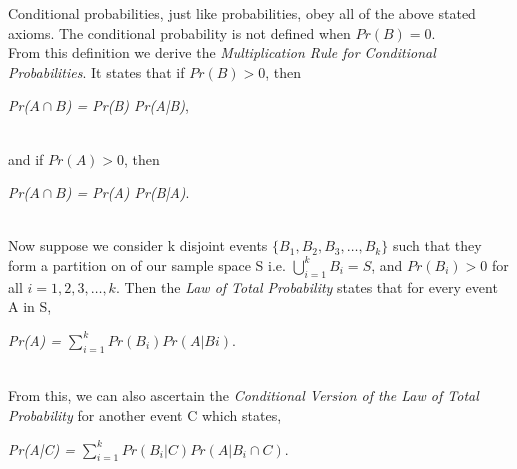 \documentclass[12pt,twoside]{reedthesis}
\begin{document}
Conditional probabilities, just like probabilities, obey all of the above stated axioms. The conditional probability is not defined when $Pr(B) = 0$. \\

From this definition we derive the \textit{Multiplication Rule for Conditional Probabilities}. It states that if $Pr(B)> 0$, then 
\begin{center} 
\textit{Pr($A\cap B$) = Pr(B) Pr(A|B)},
\end{center} \\

and if $Pr(A)> 0$, then 
\begin{center} 
\textit{Pr($A\cap B$) = Pr(A) Pr(B|A)}.
\end{center}\\

Now suppose we consider k disjoint events $\{B_1, B_2, B_3, \dotsc, B_k\}$ such that they form a partition on of our sample space S i.e. $\bigcup\limits_{i=1}^k B_i  = S$, and $Pr(B_i) > 0$ for all $i = 1, 2, 3, \dotsc, k$. Then the \textit{Law of Total Probability} states that for every event A in S,
\begin{center} 
\textit{Pr(A) = $\sum\limits_{i=1}^k Pr(B_i) Pr(A|Bi)$}.
\end{center}\\

From this, we can also ascertain the \textit{Conditional Version of the Law of Total Probability} for another event C which states,
 \begin{center} 
\textit{Pr(A|C) = $\sum\limits_{i=1}^k Pr(B_{i}|C) Pr(A|B_i \cap C)$}.
 \end{center}\\
\end{document}
